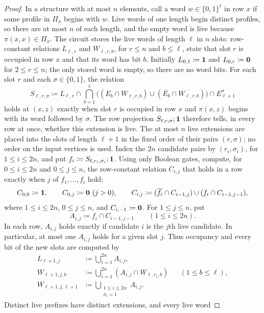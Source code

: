\begin{proof}
In a structure with at most $n$ elements, call a word
$w\in\{0,1\}^\ell$  in row $x$ if some profile in $\Pi_x$
begins with $w$. Live words of one length begin distinct profiles, so
there are at most $n$ of each length, and the empty word is live because
$\pi(x,x)\in\Pi_x$. The circuit stores the live words of length $\ell$ in
$n$ slots: row-constant relations $L_{\ell,r}$ and $W_{\ell,r,b}$, for
$r\le n$ and $b\le\ell$, state that slot $r$ is occupied in row $x$ and
that its word has bit $b$. Initially $L_{0,1}\coloneqq\mathbf{1}$ and
$L_{0,r}\coloneqq\mathbf{0}$ for $2\le r\le n$; the only stored word
is empty, so there are no word bits. For each slot $r$ and each
$\sigma\in\{0,1\}$, the relation
\[
 S_{\ell,r,\sigma}\coloneqq L_{\ell,r}\cap
 \bigcap_{b=1}^{\ell}\bigl((E_b\cap W_{\ell,r,b})\cup
     (\overline{E_b}\cap\overline{W_{\ell,r,b}})\bigr)\cap E_{\ell+1}^\sigma
\]
holds at $(x,z)$ exactly when slot $r$ is occupied in row $x$ and
$\pi(x,z)$ begins with its word followed by $\sigma$. The row projection
$S_{\ell,r,\sigma};\mathbf{1}$ therefore tells, in every row at once, whether
this extension is live. The at most $n$ live extensions are placed into the slots of length
$\ell+1$ in the fixed order of their pairs $(r,\sigma)$; no order on
the input vertices is used. Index the $2n$ candidate pairs by
$(r_i,\sigma_i)$, for $1\le i\le 2n$, and put
$f_i\coloneqq S_{\ell,r_i,\sigma_i};\mathbf{1}$. Using only Boolean gates,
compute, for $0\le i\le 2n$ and $0\le j\le n$, the row-constant
relation $C_{i,j}$ that holds in a row exactly when $j$ of
$f_1,\ldots,f_i$ hold:
\[
 C_{0,0}\coloneqq\mathbf{1},\qquad C_{0,j}\coloneqq\mathbf{0}\ (j>0),\qquad
 C_{i,j}\coloneqq(\overline{f_i}\cap C_{i-1,j})
       \cup(f_i\cap C_{i-1,j-1}),
\]
where $1\le i\le 2n$, $0\le j\le n$, and
$C_{i,-1}\coloneqq\mathbf{0}$. For $1\le j\le n$, put
\[
 A_{i,j}\coloneqq f_i\cap C_{i-1,j-1}\qquad(1\le i\le 2n).
\]
In each row, $A_{i,j}$ holds exactly if candidate $i$ is the $j$th
live candidate. In particular, at most one $A_{i,j}$ holds for a given
slot $j$. Thus occupancy and every bit of the new slots are computed by
\[
\begin{aligned}
 L_{\ell+1,j}
   &\coloneqq\bigcup_{i=1}^{2n} A_{i,j},\\
 W_{\ell+1,j,b}
   &\coloneqq\bigcup_{i=1}^{2n}
       (A_{i,j}\cap W_{\ell,r_i,b})
       &&(1\le b\le\ell),\\
 W_{\ell+1,j,\ell+1}
   &\coloneqq\bigcup_{\substack{1\le i\le 2n\\\sigma_i=1}} A_{i,j}.
\end{aligned}
\]
Distinct live prefixes have distinct extensions, and every live word

\end{proof}
